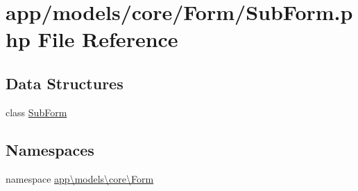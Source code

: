 \hypertarget{_sub_form_8php}{\section{app/models/core/\-Form/\-Sub\-Form.php File Reference}
\label{_sub_form_8php}
}
\subsection*{Data Structures}
\begin{DoxyCompactItemize}
\item 
class \hyperlink{classapp_1_1models_1_1core_1_1_form_1_1_sub_form}{Sub\-Form}
\end{DoxyCompactItemize}
\subsection*{Namespaces}
\begin{DoxyCompactItemize}
\item 
namespace \hyperlink{namespaceapp_1_1models_1_1core_1_1_form}{app\textbackslash{}models\textbackslash{}core\textbackslash{}\-Form}
\end{DoxyCompactItemize}
